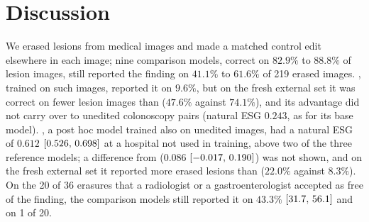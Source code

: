 \section{Discussion}\label{sec:discussion}

We erased lesions from medical images and made a matched control edit elsewhere in each image; nine comparison models, correct on $82.9\%$ to $88.8\%$ of lesion images, still reported the finding on $41.1\%$ to $61.6\%$ of 219 erased images. \ms, trained on such images, reported it on $9.6\%$, but on the fresh external set it was correct on fewer lesion images than \gem{} ($47.6\%$ against $74.1\%$), and its advantage did not carry over to unedited colonoscopy pairs (natural ESG $0.243$, as for its base model). \msn, a post hoc model trained also on unedited images, had a natural ESG of $0.612$ $[0.526,\,0.698]$ at a hospital not used in training, above two of the three reference models; a difference from \gem{} ($0.086$ $[-0.017,\,0.190]$) was not shown, and on the fresh external set it reported more erased lesions than \ms{} ($22.0\%$ against $8.3\%$). On the 20 of 36 erasures that a radiologist or a gastroenterologist accepted as free of the finding, the comparison models still reported it on $43.3\%$ $[31.7,\,56.1]$ and \ms{} on 1 of 20.

